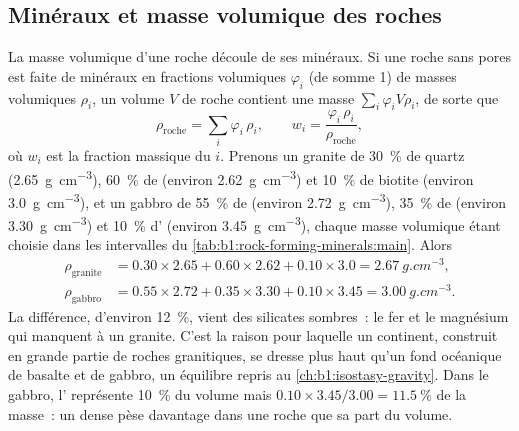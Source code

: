 \subsection{Minéraux et masse volumique des roches}

La masse volumique d'une roche découle de ses minéraux. Si une roche sans pores
est faite de minéraux en fractions volumiques $\varphi_i$ (de somme 1) de masses
volumiques $\rho_i$, un volume $V$ de roche contient une masse
$\sum_i \varphi_i V \rho_i$, de sorte que
\[
  \rho_{\text{roche}} = \sum_i \varphi_i\,\rho_i ,
  \qquad
  w_i = \frac{\varphi_i\,\rho_i}{\rho_{\text{roche}}},
\]
où $w_i$ est la fraction massique du  $i$. Prenons un granite de
\qty{30}{\percent} de quartz (\qty{2.65}{g.cm^{-3}}), \qty{60}{\percent} de
 (environ \qty{2.62}{g.cm^{-3}}) et \qty{10}{\percent} de biotite
(environ \qty{3.0}{g.cm^{-3}}), et un gabbro de \qty{55}{\percent} de 
(environ \qty{2.72}{g.cm^{-3}}), \qty{35}{\percent} de  (environ
\qty{3.30}{g.cm^{-3}}) et \qty{10}{\percent} d' (environ
\qty{3.45}{g.cm^{-3}}), chaque masse volumique étant choisie dans les intervalles
du \cref{tab:b1:rock-forming-minerals:main}. Alors
\begin{align*}
  \rho_{\text{granite}} &= 0.30\times2.65 + 0.60\times2.62 + 0.10\times3.0
  = \qty{2.67}{g.cm^{-3}},\\
  \rho_{\text{gabbro}} &= 0.55\times2.72 + 0.35\times3.30 + 0.10\times3.45
  = \qty{3.00}{g.cm^{-3}}.
\end{align*}
La différence, d'environ \qty{12}{\percent}, vient des silicates sombres~: le fer
et le magnésium qui manquent à un granite. C'est la raison pour laquelle un
continent, construit en grande partie de roches granitiques, se dresse plus haut
qu'un fond océanique de basalte et de gabbro, un équilibre repris au
\cref{ch:b1:isostasy-gravity}. Dans le gabbro, l' représente
\qty{10}{\percent} du volume mais $0.10\times3.45/3.00 = \qty{11.5}{\percent}$ de
la masse~: un  dense pèse davantage dans une roche que sa part du volume.

